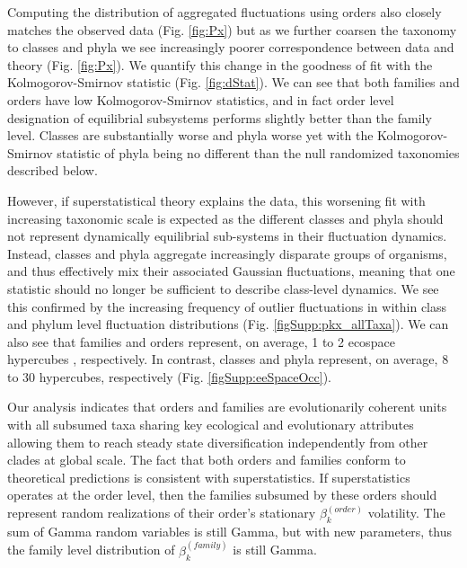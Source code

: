 \documentclass[12pt]{article}
\let\citep=\cite
\begin{document}
Computing the distribution of aggregated fluctuations using orders
also closely matches the observed data (Fig. \ref{fig:Px}) but as we
further coarsen the taxonomy to classes and phyla we see increasingly
poorer correspondence between data and theory (Fig. \ref{fig:Px}). We
quantify this change in the goodness of fit with the
Kolmogorov-Smirnov statistic (Fig. \ref{fig:dStat}). We can see that
both families and orders have low Kolmogorov-Smirnov statistics, and
in fact order level designation of equilibrial subsystems performs
slightly better than the family level. Classes are substantially worse
and phyla worse yet with the Kolmogorov-Smirnov statistic of phyla
being no different than the null randomized taxonomies described
below.

However, if superstatistical theory explains the data, this worsening
fit with increasing taxonomic scale is expected as the different
classes and phyla should not represent dynamically equilibrial
sub-systems in their fluctuation dynamics. Instead, classes and phyla
aggregate increasingly disparate groups of organisms, and thus
effectively mix their associated Gaussian fluctuations, meaning that
one statistic should no longer be sufficient to describe class-level
dynamics. We see this confirmed by the increasing frequency of outlier
fluctuations in within class and phylum level fluctuation
distributions (Fig. \ref{figSupp:pkx_allTaxa}). We can also see that
families and orders represent, on average, 1 to 2 ecospace hypercubes
\citep[defined by taxon environment, motility, life habit, vision,
diet, reproduction, and ontogeny][]{bambach1983, bambach2007,
  bush2007}, respectively. In contrast, classes and phyla represent,
on average, 8 to 30 hypercubes, respectively
(Fig. \ref{figSupp:eeSpaceOcc}).


Our analysis indicates that orders and families are evolutionarily
coherent units with all subsumed taxa sharing key ecological
and evolutionary attributes allowing them to reach steady state
diversification independently from other clades at global scale. The
fact that both orders and families conform to theoretical predictions
is consistent with superstatistics. If superstatistics operates at the
order level, then the families subsumed by these orders should
represent random realizations of their order's stationary $\beta_k^{(order)}$
volatility. The sum of Gamma random variables is still Gamma, but with
new parameters, thus the family level distribution of
$\beta_k^{(family)}$ is still Gamma.
\end{document}
